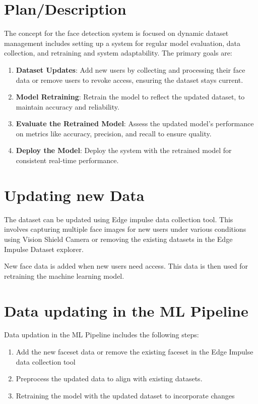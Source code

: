 \section{Plan/Description}
The concept for the face detection system is focused on dynamic dataset management includes setting up a system for regular model evaluation, data collection, and retraining and system adaptability. The primary goals are:

\begin{enumerate}
	\item \textbf{Dataset Updates}: Add new users by collecting and processing their face data or remove users to revoke access, ensuring the dataset stays current.  
	\item \textbf{Model Retraining}: Retrain the model to reflect the updated dataset, to maintain accuracy and reliability.  
	\item \textbf{Evaluate the Retrained Model}: Assess the updated model’s performance on metrics like accuracy, precision, and recall to ensure quality.  
	\item \textbf{Deploy the Model}: Deploy the system with the retrained model for consistent real-time performance.  
\end{enumerate}

\section{Updating new Data}
The dataset can be updated using Edge impulse data collection tool. This involves capturing multiple face images for new users under various conditions using Vision Shield Camera or removing the existing datasets in the Edge Impulse Dataset explorer.

New face data is added when new users need access. This data is then used for retraining the machine learning model.

\section{Data updating in the ML Pipeline}
Data updation in the ML Pipeline includes the following steps:
\begin{enumerate}
	\item Add the new faceset data or remove the existing faceset in the Edge Impulse data collection tool
	\item Preprocess the updated data to align with existing datasets.
	\item Retraining the model with the updated dataset to incorporate changes
\end{enumerate}

